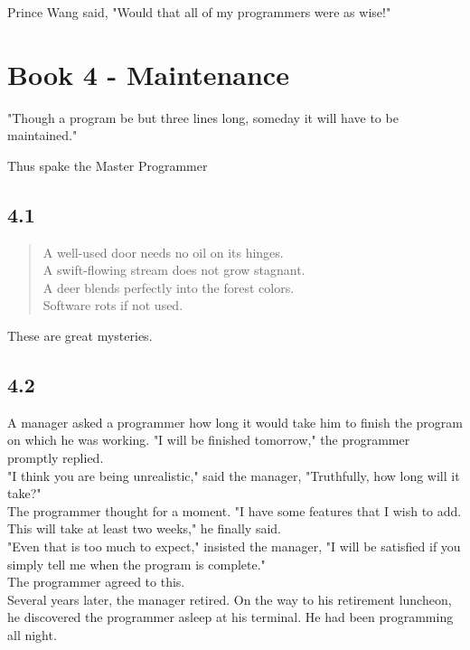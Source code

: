 \documentclass[14pt, letterpaper]{book}
\begin{document}
Prince Wang said, "Would that all of my programmers were as wise!"\\

\chapter*{Book 4 - Maintenance}
\epigraph{"Though a program be but three lines long, someday it will have to be maintained."}{Thus spake the Master Programmer}

\section*{4.1}
\begin{verse}
    A well-used door needs no oil on its hinges. \\
    A swift-flowing stream does not grow stagnant. \\
    A deer blends perfectly into the forest colors. \\
    Software rots if not used.\\
\end{verse}

These are great mysteries.    
\section*{4.2}
A manager asked a programmer how long it would take him to finish the program on which he was working. "I will be finished tomorrow," the programmer promptly replied.\\

"I think you are being unrealistic," said the manager, "Truthfully, how long will it take?"\\

The programmer thought for a moment. "I have some features that I wish to add. This will take at least two weeks," he finally said.\\

"Even that is too much to expect," insisted the manager, "I will be satisfied if you simply tell me when the program is complete."\\

The programmer agreed to this.\\

Several years later, the manager retired. On the way to his retirement luncheon, he discovered the programmer asleep at his terminal. He had been programming all night.\\
\end{document}

